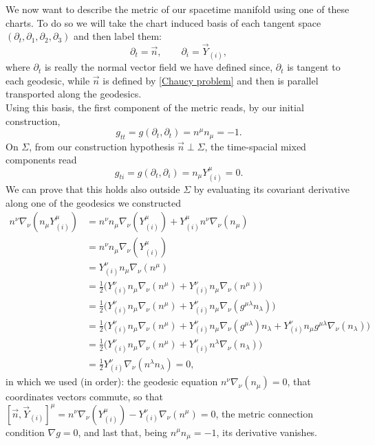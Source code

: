 We now want to describe the metric of our spacetime manifold using one of these charts. To do so we will take the chart induced basis of each tangent space $(\partial_t,\partial_1,\partial_2,\partial_3)$ and then label them:
\begin{equation}
    \partial_t=\vec n,\qquad \partial_i= \vec Y_{(i)},
\end{equation}
where $\partial_t$ is really the normal vector field we have defined since, $\partial_t$ is tangent to each geodesic, while $\vec n$ is defined by \eqref{Chaucy problem} and then is parallel transported along the geodesics.\\
Using this basis, the first component of the metric reads, by our initial construction,
\begin{equation}
    g_{tt}=g(\partial_t,\partial_t)=n^\mu n_\mu=-1.\label{gen gtt}
\end{equation} 
On $\Sigma$, from our construction hypothesis $\vec{n}\perp\Sigma $, the time-spacial mixed components read 
\begin{equation}
    g_{ti}=g(\partial_t,\partial_i)=n_\mu Y^\mu_{(i)}=0.\label{gen gti}
\end{equation} 
We can prove that this holds also outside $\Sigma$ by evaluating its covariant derivative along one of the geodesics we constructed
\begin{align*}
    n^\nu\nabla_\nu(n_\mu Y_{(i)}^\mu)&=n^\nu n_\mu \nabla_\nu( Y_{(i)}^\mu)+Y_{(i)}^\mu n^\nu  \nabla_\nu(n_\mu )\\
    &=n^\nu n_\mu \nabla_\nu( Y_{(i)}^\mu)\\
    &=Y^\nu_{(i)}n_\mu\nabla_\nu(n^\mu)\\
    &=\frac{1}{2}\big(Y^\nu_{(i)}n_\mu\nabla_\nu(n^\mu)+Y^\nu_{(i)}n_\mu\nabla_\nu(n^\mu)\big)\\
    &=\frac{1}{2}\big(Y^\nu_{(i)}n_\mu\nabla_\nu(n^\mu)+Y^\nu_{(i)}n_\mu\nabla_\nu(g^{\mu\lambda}n_{\lambda})\big)\\
    &=\frac{1}{2}\big(Y^\nu_{(i)}n_\mu\nabla_\nu(n^\mu)+Y^\nu_{(i)}n_\mu\nabla_\nu(g^{\mu\lambda})n_{\lambda}+Y^\nu_{(i)}n_\mu g^{\mu\lambda}\nabla_\nu(n_{\lambda})\big)\\
    &=\frac{1}{2}\big(Y^\nu_{(i)}n_\mu\nabla_\nu(n^\mu)+Y^\nu_{(i)}n^\lambda\nabla_\nu(n_{\lambda})\big)\\
    &=\frac{1}{2}Y^\nu_{(i)}\nabla_\nu(n^\lambda n_\lambda)=0,
\end{align*}
in which we used (in order): the geodesic equation $n^\nu  \nabla_\nu(n_\mu )=0$, that coordinates vectors commute, so that $[\vec n,\vec Y_{(i)}]^\mu=n^\nu \nabla_\nu( Y_{(i)}^\mu)-Y^\nu_{(i)}\nabla_\nu(n^\mu)=0$, the metric connection condition $\nabla g=0$, and last that, being $n^\mu n_\mu=-1$, its derivative vanishes.\\
